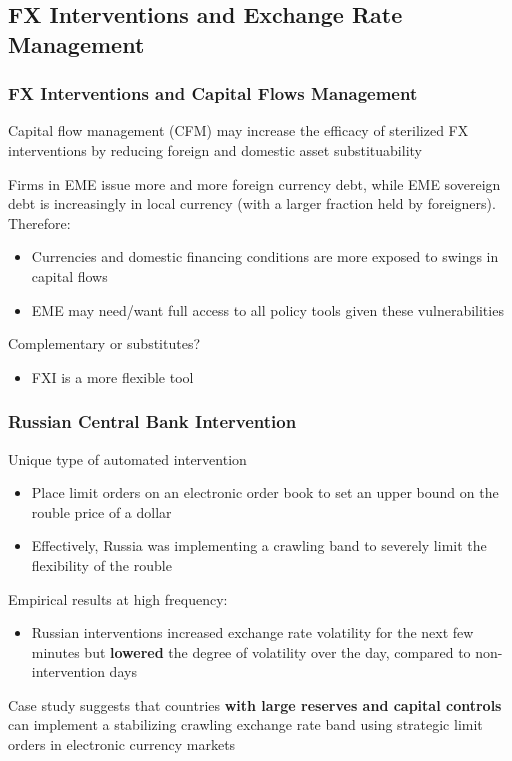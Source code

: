 \documentclass{beamer}
\newenvironment{wideitemize}{\itemize\addtolength{\itemsep}{10pt}}{\enditemize}
\begin{document}
\subsection{FX Interventions and Exchange Rate Management}

\begin{frame}
  \frametitle{FX Interventions and Capital Flows Management}
  \begin{wideitemize}
    \item Capital flow management (CFM) may increase the efficacy of sterilized FX interventions by reducing foreign and domestic asset substituability
    \item Firms in EME issue more and more foreign currency debt, while EME sovereign debt is increasingly in local currency (with a larger fraction held by foreigners). Therefore:
      \begin{itemize}
      \item Currencies and domestic financing conditions are more exposed to swings in capital flows
      \item EME may need/want full access to all policy tools given these vulnerabilities
      \end{itemize}
    \item Complementary or substitutes?
      \begin{itemize}
      \item FXI is a more flexible tool
      \end{itemize}
  \end{wideitemize}
\end{frame}


\begin{frame}
  \frametitle{Russian Central Bank Intervention}
  \begin{wideitemize}
  \item Unique type of automated intervention
    \begin{itemize}
    \item Place limit orders on an electronic order book to set an upper bound on the rouble price of a dollar
    \item Effectively, Russia was implementing a crawling band to severely limit the flexibility of the rouble
    \end{itemize}
  \item Empirical results \href{https://www.sciencedirect.com/science/article/abs/pii/S0022199609000890}{} at high frequency:
    \begin{itemize}
    \item Russian interventions increased exchange rate volatility for the next few minutes but \textbf{lowered} the degree of volatility over the day, compared to non-intervention days
    \end{itemize}
      \item Case study suggests that countries \textbf{with large reserves and capital controls} can implement a stabilizing crawling exchange rate band using strategic limit orders in electronic currency markets
  \end{wideitemize}
\end{frame}
\end{document}
